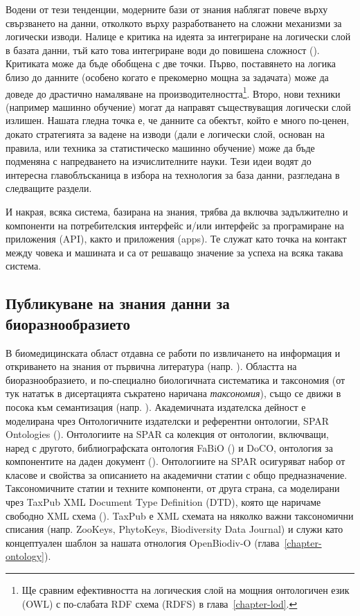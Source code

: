 Водени от тези тенденции, модерните бази от знания наблягат повече върху свързването на данни, отколкото върху разработването на сложни механизми за логически изводи. Налице е критика на идеята за интегриране на логически слой в базата данни, тъй като това интегриране води до повишена сложност (\cite {barrasa_rdf_2017}). Критиката може да бъде обобщена с две точки. Първо, поставянето на логика близо до данните (особено когато е прекомерно мощна за задачата) може да доведе до драстично намаляване на производителността\footnote {Ще сравним ефективността на логическия слой на мощния онтологичен език (OWL) с по-слабата RDF схема (RDFS)  в глава~\ref{chapter-lod}.}.  Второ, нови техники (например машинно обучение) могат да направят съществуващия логически слой излишен. Нашата гледна точка е, че данните са обектът, който е много по-ценен, докато стратегията за вадене на изводи (дали е логически слой, основан на правила, или техника за статистическо машинно обучение) може да бъде подменяна с напредването на изчислителните науки. Тези идеи водят до интересна главоблъсканица в избора на технология за база данни, разгледана в следващите раздели.

И накрая, всяка система, базирана на знания, трябва да включва задължително и компоненти на потребителския интерфейс и/или интерфейс за програмиране на приложения (API), както и приложения (apps). Те служат като точка на контакт между човека и машината и са от решаващо значение за успеха на всяка такава система.

\subsection*{Публикуване на знания данни за биоразнообразието}

В биомедицинската област отдавна се работи по извличането на информация и откриването на знания от първична литература (напр. \cite {rebholz-schuhmann_facts_2005, momtchev_expanding_2009, williams_open_2012}). Областта на биоразнообразието, и по-специално биологичната систематика и таксономия (от тук нататък в дисертацията съкратено наричана \emph{таксономия}), също се движи в посока към семантизация (напр. \cite{agosti_biodiversity_2006, patterson_taxonomic_2006, kennedy_scientific_2005, penev_fast_2010, tzitzikas_integrating_2013}). Академичната издателска дейност е моделирана чрез Онтологичните издателски и референтни онтологии, SPAR Ontologies (\cite {peroni_semantic_2014}). Онтологиите на SPAR са колекция от онтологии, включващи, наред с другото, библиографската онтология FaBiO (\cite{peroni_fabio_2012}) и DoCO, онтология за компонентите на даден документ (\cite{constantin_document_2016}). Онтологиите на SPAR осигуряват набор от класове и свойства за описанието на академични статии с общо предназначение. Таксономичните статии и техните компоненти, от друга страна, са моделирани чрез TaxPub XML Document Type Definition (DTD), която ще наричаме свободно XML схема (\cite{catapano_taxpub:_2010}). TaxPub е XML схемата на няколко важни таксономични списания (напр. ZooKeys, PhytoKeys, Biodiversity Data Journal) и служи като концептуален шаблон за нашата отнология OpenBiodiv-O (глава~\ref{chapter-ontology}).

